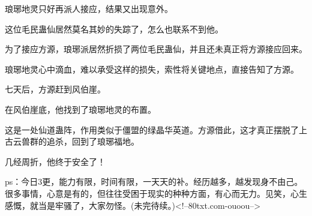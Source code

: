 \begin{this_body}
琅琊地灵只好再派人接应，结果又出现意外。

这位毛民蛊仙居然莫名其妙的失踪了，怎么也联系不到他。

为了接应方源，琅琊派居然折损了两位毛民蛊仙，并且还未真正将方源接应回来。

琅琊地灵心中滴血，难以承受这样的损失，索性将关键地点，直接告知了方源。

七天后，方源赶到风伯崖。

在风伯崖底，他找到了琅琊地灵的布置。

这是一处仙道蛊阵，作用类似于僵盟的绿晶华英道。方源借此，这才真正摆脱了上古云兽群的追杀，回到了琅琊福地。

几经周折，他终于安全了！

ps：今日3更，能力有限，时间有限，一天天的补。经历越多，越发现身不由己。很多事情，心意是有的，但往往受困于现实的种种方面，有心而无力。见笑，心生感慨，就当是牢骚了，大家勿怪。(未完待续。)<!--80txt.com-ouoou-->

\end{this_body}

